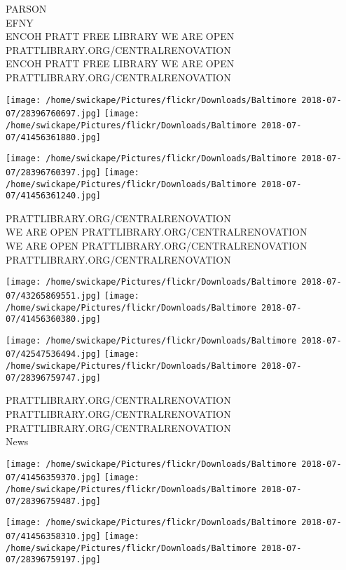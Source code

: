 \documentclass[10pt,letterpaper]{article}
\begin{document}
PARSON\\
EFNY\\
ENCOH PRATT FREE LIBRARY WE ARE OPEN PRATTLIBRARY.ORG/CENTRALRENOVATION\\
ENCOH PRATT FREE LIBRARY WE ARE OPEN PRATTLIBRARY.ORG/CENTRALRENOVATION\\
\pagebreak

\texttt{[image: /home/swickape/Pictures/flickr/Downloads/Baltimore 2018-07-07/28396760697.jpg]}
\texttt{[image: /home/swickape/Pictures/flickr/Downloads/Baltimore 2018-07-07/41456361880.jpg]}

\texttt{[image: /home/swickape/Pictures/flickr/Downloads/Baltimore 2018-07-07/28396760397.jpg]}
\texttt{[image: /home/swickape/Pictures/flickr/Downloads/Baltimore 2018-07-07/41456361240.jpg]}

PRATTLIBRARY.ORG/CENTRALRENOVATION\\
WE ARE OPEN PRATTLIBRARY.ORG/CENTRALRENOVATION\\
WE ARE OPEN PRATTLIBRARY.ORG/CENTRALRENOVATION\\
PRATTLIBRARY.ORG/CENTRALRENOVATION\\
\pagebreak

\texttt{[image: /home/swickape/Pictures/flickr/Downloads/Baltimore 2018-07-07/43265869551.jpg]}
\texttt{[image: /home/swickape/Pictures/flickr/Downloads/Baltimore 2018-07-07/41456360380.jpg]}

\texttt{[image: /home/swickape/Pictures/flickr/Downloads/Baltimore 2018-07-07/42547536494.jpg]}
\texttt{[image: /home/swickape/Pictures/flickr/Downloads/Baltimore 2018-07-07/28396759747.jpg]}

PRATTLIBRARY.ORG/CENTRALRENOVATION\\
PRATTLIBRARY.ORG/CENTRALRENOVATION\\
PRATTLIBRARY.ORG/CENTRALRENOVATION\\
News\\
\pagebreak

\texttt{[image: /home/swickape/Pictures/flickr/Downloads/Baltimore 2018-07-07/41456359370.jpg]}
\texttt{[image: /home/swickape/Pictures/flickr/Downloads/Baltimore 2018-07-07/28396759487.jpg]}

\texttt{[image: /home/swickape/Pictures/flickr/Downloads/Baltimore 2018-07-07/41456358310.jpg]}
\texttt{[image: /home/swickape/Pictures/flickr/Downloads/Baltimore 2018-07-07/28396759197.jpg]}
\end{document}
